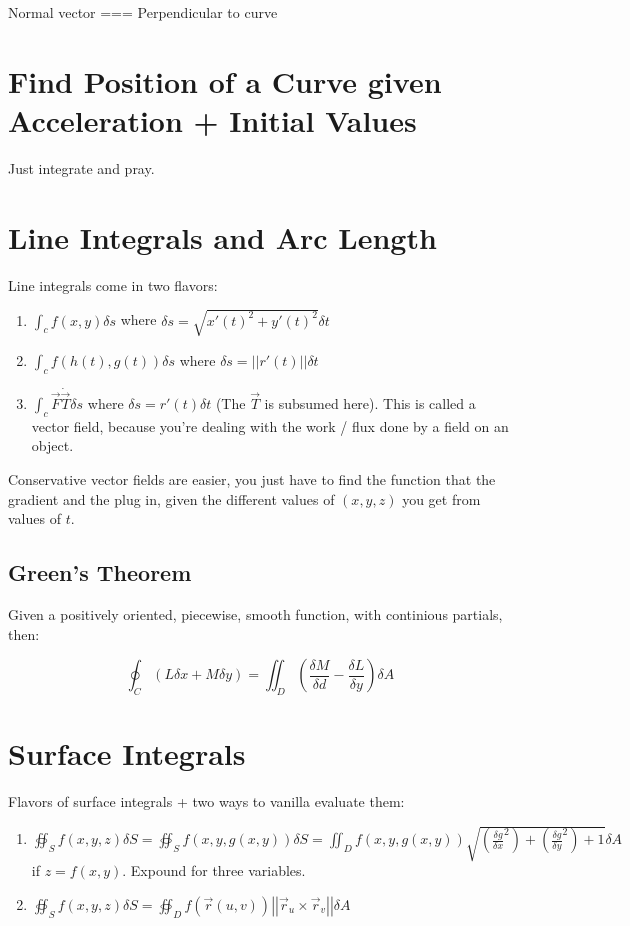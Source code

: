 \documentclass{article}
\begin{document}
Normal vector === Perpendicular to curve

\section{Find Position of a Curve given Acceleration + Initial Values}

Just integrate and pray.


\section{Line Integrals and Arc Length}

Line integrals come in two flavors:

\begin{enumerate}
    \item  $\int_c f(x, y) \delta s$ where $\delta s = \sqrt{x'(t)^2 + y'(t)^2} \delta t$
    \item $\int_c f(h(t), g(t)) \delta s$ where $\delta s = \left|\left|r'(t)\right|\right| \delta t$
    \item  $\int_c \vec{F} \dot \vec{T} \delta s$ where $\delta s = r'(t) \delta t$ (The $\vec{T}$ is subsumed here). This is called a vector field, because you're dealing with the work / flux done by a field on an object.
\end{enumerate}

Conservative vector fields are easier, you just have to find the function that the gradient and the plug in, given the different values of $(x, y, z)$ you get from values of $t$.

\subsection{Green's Theorem}

Given a positively oriented, piecewise, smooth function, with continious partials, then:

$$ \oint_C (L \delta x + M\delta y) = \iint_D (\frac{\delta M}{\delta d} - \frac{\delta L}{\delta y})\delta A$$

\section{Surface Integrals}

Flavors of surface integrals + two ways to vanilla evaluate them:

\begin{enumerate}
    \item $\oiint_S f(x, y, z) \delta S = \oiint_S f(x, y, g(x, y)) \delta S = \iint_D f(x, y, g(x, y)) \sqrt{(\frac{\delta g}{\delta x}^2) + (\frac{\delta g}{\delta y}^2) + 1} \delta A$ if $z = f(x, y)$. Expound for three variables.
    \item $\oiint_S f(x, y, z) \delta S = \oiint_D f(\vec{r}(u, v)) \left|\left|\vec{r}_u \times \vec{r}_v \right|\right| \delta A $
\end{enumerate}
\end{document}
